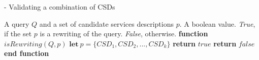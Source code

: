 %

\begin{algorithm}[h!]
\small
\caption{ - Validating a combination of CSDs}
\label{isrewriting}
\begin{algorithmic}[1]
\REQUIRE A query $Q$ and a set of candidate services descriptions $p$.
\ENSURE A boolean value. \textit{True}, if the set $p$ is a rewriting of the query. \textit{False}, otherwise.
\STATE \textbf{function} $\mathit{isRewriting} (Q, p)$
\STATE  $\mathbf{let} \ p = \lbrace CSD_{1}, CSD_{2}, ..., CSD_{k} \rbrace$
	\STATE \textbf{return} $true$		
\ENDIF
\STATE \textbf{return} $false$
\STATE \textbf{end function}
\end{algorithmic}
\end{algorithm}

